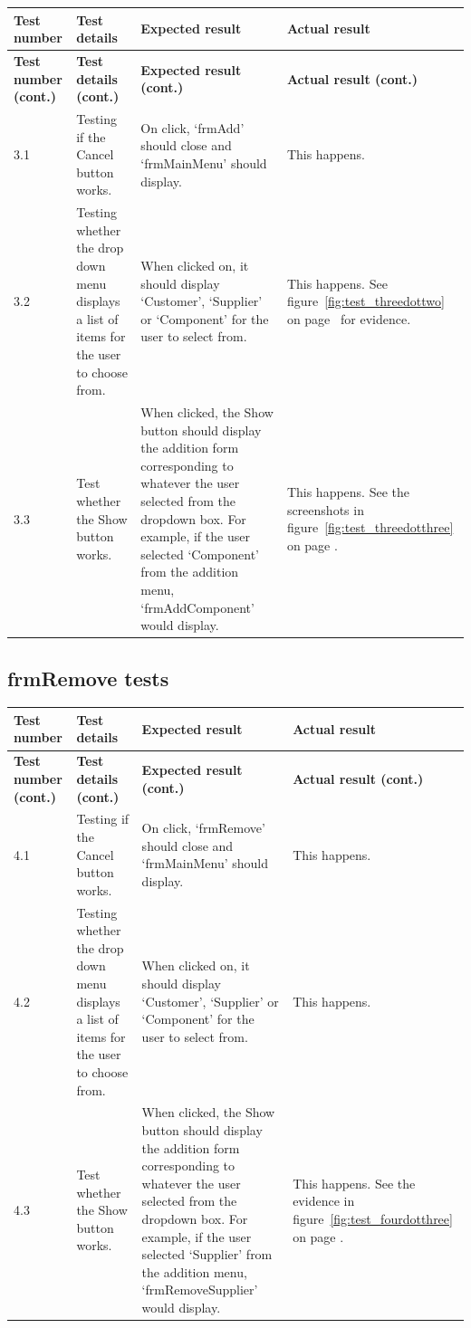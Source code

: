 \begin{longtable}{ | p{2cm} | p{4cm} | p{4cm} | p{4cm} | }
	\hline
	\textbf{Test number} & \textbf{Test details} & \textbf{Expected result} & \textbf{Actual result}\\
	\endfirsthead
	\hline
	\textbf{Test number (cont.)} & \textbf{Test details (cont.)} & \textbf{Expected result (cont.)} & \textbf{Actual result (cont.)}\\
	\endhead
	\hline
	3.1 & Testing if the Cancel button works. & On click, `frmAdd' should close and `frmMainMenu' should display. & This happens.\\
	\hline
	3.2 & Testing whether the drop down menu displays a list of items for the user to choose from. & When clicked on, it should display `Customer', `Supplier' or `Component' for the user to select from. & This happens.  See figure~\ref{fig:test_threedottwo} on page~\pageref{fig:test_threedottwo} for evidence.\\
	\hline
	3.3 & Test whether the Show button works. & When clicked, the Show button should display the addition form corresponding to whatever the user selected from the dropdown box. For example, if the user selected `Component' from the addition menu, `frmAddComponent' would display. & This happens.  See the screenshots in figure~\ref{fig:test_threedotthree} on page \pageref{fig:test_threedotthree}.\\
	\hline
\end{longtable}

\subsection{frmRemove tests}

\begin{longtable}{ | p{2cm} | p{4cm} | p{4cm} | p{4cm} | }
	\hline
	\textbf{Test number} & \textbf{Test details} & \textbf{Expected result} & \textbf{Actual result}\\
	\endfirsthead
	\hline
	\textbf{Test number (cont.)} & \textbf{Test details (cont.)} & \textbf{Expected result (cont.)} & \textbf{Actual result (cont.)}\\
	\endhead
	\hline
	4.1 & Testing if the Cancel button works. & On click, `frmRemove' should close and `frmMainMenu' should display. & This happens.\\
	\hline
	4.2 & Testing whether the drop down menu displays a list of items for the user to choose from. & When clicked on, it should display `Customer', `Supplier' or `Component' for the user to select from. & This happens.\\
	\hline
	4.3 & Test whether the Show button works. & When clicked, the Show button should display the addition form corresponding to whatever the user selected from the dropdown box. For example, if the user selected `Supplier' from the addition menu, `frmRemoveSupplier' would display. & This happens.  See the evidence in figure~\ref{fig:test_fourdotthree} on page \pageref{fig:test_fourdotthree}.\\
	\hline
\end{longtable}

